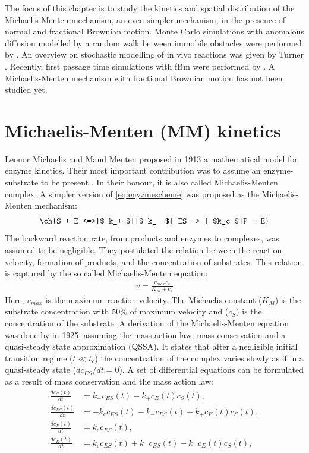 \documentclass[
  a4paper,BCOR10mm,twoside,
  headsepline,footsepline,%
  fleqn,openbib
]{scrbook}
\begin{document}
The focus of this chapter is to study the kinetics and spatial distribution of the Michaelis-Menten mechanism, an even simpler mechanism, in the presence of normal and fractional Brownian motion. Monte Carlo simulations with anomalous diffusion modelled by a random walk between immobile obstacles were performed by \citet{Berry2002, Schnell2004}. An overview on stochastic modelling of in vivo reactions was given by Turner \cite{Turner2004}. Recently, first passage time simulations with fBm were performed by \citet{Jeon2014}. A Michaelis-Menten mechanism with fractional Brownian motion has not been studied yet.
\section{Michaelis-Menten (MM) kinetics}
Leonor Michaelis and Maud Menten  proposed in 1913 a mathematical model for enzyme kinetics. Their most important contribution was to assume an enzyme-substrate to be present \cite{michaelis1913kinetik}. In their honour, it is also called Michaelis-Menten complex. A simpler version of \cref{eq:enyzmescheme} was proposed as the Michaelis-Menten mechanism:
\begin{align} \label{eq:michaelismechanism}
\ch{S + E <=>[$ k_+ $][$ k_- $] ES -> [ $k_c $]P + E}
\end{align}
 The backward reaction rate, from products and enzymes to complexes, was assumed to be negligible. They postulated the relation between the reaction velocity, formation of products, and the concentration of substrates. This relation is captured by the so called Michaelis-Menten equation:
\begin{align} \label{michaelis-menten-equation}
 v=\frac{v_{max} c_s}{K_M+ c_s}
\end{align}
Here, $v_{max}$ is the maximum reaction velocity. The Michaelis constant ($K_M$) is the substrate concentration with $50 \%$ of maximum velocity and ($c_S$)  is the concentration of the substrate. A derivation of the Michaelis-Menten equation was done by \citet{Briggs1925} in 1925, assuming the mass action law, mass conservation and a quasi-steady state approximation (QSSA). It states that after a negligible initial transition regime ($t \ll t_c$) the concentration of the complex varies slowly as if in a quasi-steady state ($dc_{ES}/dt=0$). A set of differential equations can be formulated as a result of mass conservation and the mass action law:
\begin{align}
\frac{dc_S(t)}{dt} &= k_{\mathrm{-}} c_{ES}(t)-k_{\mathrm{+}} c_E(t) c_S(t),\\
\frac{dc_{ES}(t)}{dt} &=  - k_{\mathrm{c}} c_{ES}(t) -k_{\mathrm{-}} c_{ES}(t)+k_{\mathrm{+}} c_E(t) c_S(t), \label{quasisteadymichaelis} \\
\frac{dc_P(t)}{dt} &= k_{\mathrm{c}} c_{ES}(t)  \label{first}, \\
\frac{dc_E(t)}{dt} &= k_{\mathrm{c}} c_{ES}(t)+k_{\mathrm{-}} c_{ES}(t)-k_{\mathrm{-}} c_E(t) c_S(t),
\end{align}
\end{document}
